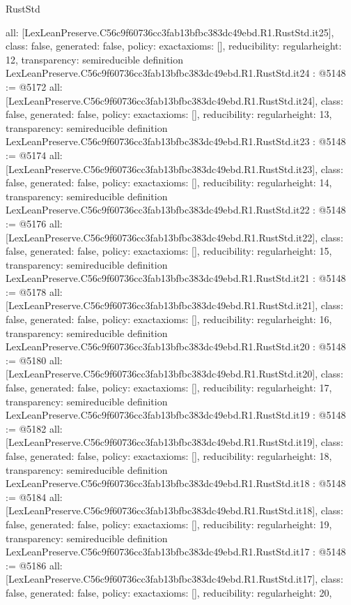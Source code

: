 \begin{lexlean}{RustStd}
\begin{coremodule}
{  all: [LexLeanPreserve.C56c9f60736cc3fab13bfbc383dc49ebd.R1.RustStd.it25],
  class: false,
  generated: false,
  policy: exact{axioms: []},
  reducibility: regular{height: 12},
  transparency: semireducible
}
definition LexLeanPreserve.C56c9f60736cc3fab13bfbc383dc49ebd.R1.RustStd.it24 : @5148 := @5172 {
  all: [LexLeanPreserve.C56c9f60736cc3fab13bfbc383dc49ebd.R1.RustStd.it24],
  class: false,
  generated: false,
  policy: exact{axioms: []},
  reducibility: regular{height: 13},
  transparency: semireducible
}
definition LexLeanPreserve.C56c9f60736cc3fab13bfbc383dc49ebd.R1.RustStd.it23 : @5148 := @5174 {
  all: [LexLeanPreserve.C56c9f60736cc3fab13bfbc383dc49ebd.R1.RustStd.it23],
  class: false,
  generated: false,
  policy: exact{axioms: []},
  reducibility: regular{height: 14},
  transparency: semireducible
}
definition LexLeanPreserve.C56c9f60736cc3fab13bfbc383dc49ebd.R1.RustStd.it22 : @5148 := @5176 {
  all: [LexLeanPreserve.C56c9f60736cc3fab13bfbc383dc49ebd.R1.RustStd.it22],
  class: false,
  generated: false,
  policy: exact{axioms: []},
  reducibility: regular{height: 15},
  transparency: semireducible
}
definition LexLeanPreserve.C56c9f60736cc3fab13bfbc383dc49ebd.R1.RustStd.it21 : @5148 := @5178 {
  all: [LexLeanPreserve.C56c9f60736cc3fab13bfbc383dc49ebd.R1.RustStd.it21],
  class: false,
  generated: false,
  policy: exact{axioms: []},
  reducibility: regular{height: 16},
  transparency: semireducible
}
definition LexLeanPreserve.C56c9f60736cc3fab13bfbc383dc49ebd.R1.RustStd.it20 : @5148 := @5180 {
  all: [LexLeanPreserve.C56c9f60736cc3fab13bfbc383dc49ebd.R1.RustStd.it20],
  class: false,
  generated: false,
  policy: exact{axioms: []},
  reducibility: regular{height: 17},
  transparency: semireducible
}
definition LexLeanPreserve.C56c9f60736cc3fab13bfbc383dc49ebd.R1.RustStd.it19 : @5148 := @5182 {
  all: [LexLeanPreserve.C56c9f60736cc3fab13bfbc383dc49ebd.R1.RustStd.it19],
  class: false,
  generated: false,
  policy: exact{axioms: []},
  reducibility: regular{height: 18},
  transparency: semireducible
}
definition LexLeanPreserve.C56c9f60736cc3fab13bfbc383dc49ebd.R1.RustStd.it18 : @5148 := @5184 {
  all: [LexLeanPreserve.C56c9f60736cc3fab13bfbc383dc49ebd.R1.RustStd.it18],
  class: false,
  generated: false,
  policy: exact{axioms: []},
  reducibility: regular{height: 19},
  transparency: semireducible
}
definition LexLeanPreserve.C56c9f60736cc3fab13bfbc383dc49ebd.R1.RustStd.it17 : @5148 := @5186 {
  all: [LexLeanPreserve.C56c9f60736cc3fab13bfbc383dc49ebd.R1.RustStd.it17],
  class: false,
  generated: false,
  policy: exact{axioms: []},
  reducibility: regular{height: 20},
}
\end{coremodule}
\end{lexlean}
